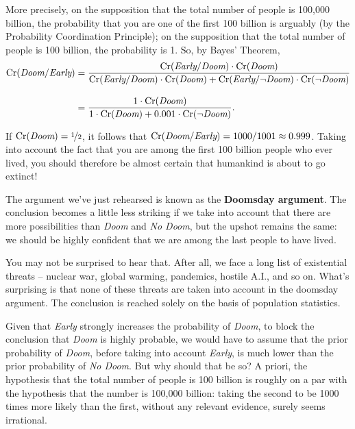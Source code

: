 More precisely, on the supposition that the total number
of people is 100,000 billion, the probability that you are one of the
first 100 billion is arguably  (by the Probability
Coordination Principle); on the supposition that the total number of
people is 100 billion, the probability is 1. So, by Bayes' Theorem,
\begin{align*}
  \text{Cr}(\emph{Doom}/\emph{Early}) &= \frac{\text{Cr}(\emph{Early}/\emph{Doom}) \cdot \text{Cr}(\emph{Doom})}{\text{Cr}(\emph{Early}/\emph{Doom}) \cdot \text{Cr}(\emph{Doom}) + \text{Cr}(\emph{Early}/\neg\emph{Doom}) \cdot \text{Cr}(\neg \emph{Doom})}\\[3mm]
    &= \frac{1 \cdot \text{Cr}(\emph{Doom})}{1 \cdot \text{Cr}(\emph{Doom}) + 0.001 \cdot \text{Cr}(\neg\emph{Doom})}.
\end{align*}

\smallskip 

If $\text{Cr}(\emph{Doom}) = \nicefrac{1}{2}$, it follows that
$\text{Cr}(\emph{Doom}/\emph{Early}) = 1000/1001 \approx 0.999$. Taking into
account the fact that you are among the first 100 billion people who
ever lived, you should therefore be almost certain that humankind is
about to go extinct!

The argument we've just rehearsed is known as the \textbf{Doomsday
  argument}. The conclusion becomes a little less striking if we take
into account that there are more possibilities than \emph{Doom} and
\emph{No Doom}, but the upshot remains the same: we should be highly
confident that we are among the last people to have lived.

You may not be surprised to hear that. After all, we face a long list
of existential threats -- nuclear war, global warming,
pandemics, hostile A.I., and so on. What's surprising is that none of
these threats are taken into account in the doomsday argument. The
conclusion is reached solely on the basis of population statistics.

Given that \emph{Early} strongly increases the probability of
\emph{Doom}, to block the conclusion that \emph{Doom} is highly
probable, we would have to assume that the prior probability of
\emph{Doom}, before taking into account \emph{Early}, is much lower
than the prior probability of \emph{No Doom}. But why should that be
so? A priori, the hypothesis that the total number of people is 100
billion is roughly on a par with the hypothesis that the number is
100,000 billion: taking the second to be 1000 times more likely than
the first, without any relevant evidence, surely seems irrational.

